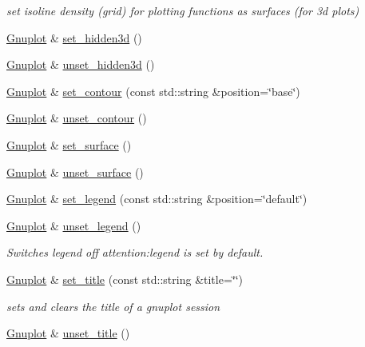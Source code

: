 \begin{DoxyCompactItemize}
\begin{DoxyCompactList}\small\item\em set isoline density (grid) for plotting functions as surfaces (for 3d plots) \end{DoxyCompactList}\item 
\hyperlink{classkukadu_1_1Gnuplot}{Gnuplot} \& \hyperlink{classkukadu_1_1Gnuplot_ac6aa969947a3e5ad968726b58d839d0a}{set\-\_\-hidden3d} ()
\item 
\hyperlink{classkukadu_1_1Gnuplot}{Gnuplot} \& \hyperlink{classkukadu_1_1Gnuplot_a4e93a0f9c069b953a70502765d31dc1e}{unset\-\_\-hidden3d} ()
\item 
\hyperlink{classkukadu_1_1Gnuplot}{Gnuplot} \& \hyperlink{classkukadu_1_1Gnuplot_a6666c2286bcd0f8fea294b94a6c8545c}{set\-\_\-contour} (const std\-::string \&position=\char`\"{}base\char`\"{})
\item 
\hyperlink{classkukadu_1_1Gnuplot}{Gnuplot} \& \hyperlink{classkukadu_1_1Gnuplot_a6fe8c0d459872698c3531c50cf57be88}{unset\-\_\-contour} ()
\item 
\hyperlink{classkukadu_1_1Gnuplot}{Gnuplot} \& \hyperlink{classkukadu_1_1Gnuplot_a2b1dba26cececc7cb0c0c3d6c6345c18}{set\-\_\-surface} ()
\item 
\hyperlink{classkukadu_1_1Gnuplot}{Gnuplot} \& \hyperlink{classkukadu_1_1Gnuplot_a23283eaf224fede9a5a9378f678226a1}{unset\-\_\-surface} ()
\item 
\hyperlink{classkukadu_1_1Gnuplot}{Gnuplot} \& \hyperlink{classkukadu_1_1Gnuplot_aca9ce23dbc33bd29ff563c23a29e47ae}{set\-\_\-legend} (const std\-::string \&position=\char`\"{}default\char`\"{})
\item 
\hyperlink{classkukadu_1_1Gnuplot}{Gnuplot} \& \hyperlink{classkukadu_1_1Gnuplot_a5c8dab8e316a7d9b316d45f715ff0859}{unset\-\_\-legend} ()
\begin{DoxyCompactList}\small\item\em Switches legend off attention\-:legend is set by default. \end{DoxyCompactList}\item 
\hyperlink{classkukadu_1_1Gnuplot}{Gnuplot} \& \hyperlink{classkukadu_1_1Gnuplot_a1f0757bd29d5e3bee4e23be95951bc13}{set\-\_\-title} (const std\-::string \&title=\char`\"{}\char`\"{})
\begin{DoxyCompactList}\small\item\em sets and clears the title of a gnuplot session \end{DoxyCompactList}\item 
\hyperlink{classkukadu_1_1Gnuplot}{Gnuplot} \& \hyperlink{classkukadu_1_1Gnuplot_a5fc9e87f3c624fbff79a960c66a16bd1}{unset\-\_\-title} ()

\end{DoxyCompactItemize}
